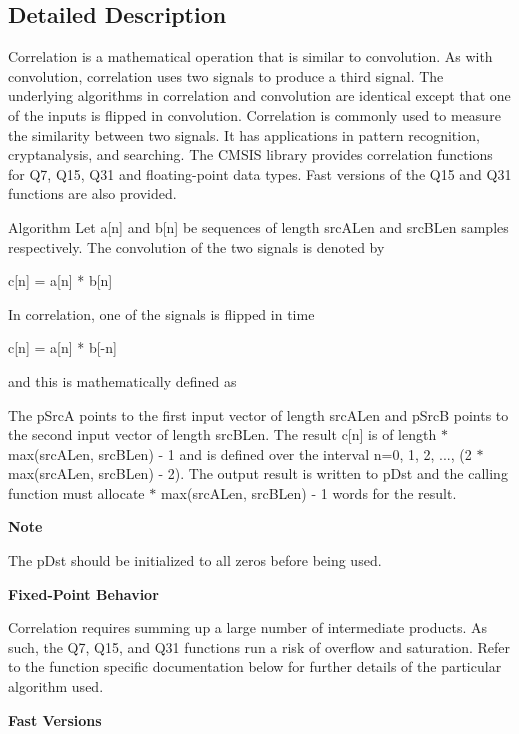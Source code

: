 \subsection{Detailed Description}
Correlation is a mathematical operation that is similar to convolution. As with convolution, correlation uses two signals to produce a third signal. The underlying algorithms in correlation and convolution are identical except that one of the inputs is flipped in convolution. Correlation is commonly used to measure the similarity between two signals. It has applications in pattern recognition, cryptanalysis, and searching. The C\+M\+S\+IS library provides correlation functions for Q7, Q15, Q31 and floating-\/point data types. Fast versions of the Q15 and Q31 functions are also provided.

\begin{DoxyParagraph}{Algorithm}
Let {\ttfamily a\mbox{[}n\mbox{]}} and {\ttfamily b\mbox{[}n\mbox{]}} be sequences of length {\ttfamily src\+A\+Len} and {\ttfamily src\+B\+Len} samples respectively. The convolution of the two signals is denoted by 
\begin{DoxyPre}
                  c[n] = a[n] * b[n]
\end{DoxyPre}
 In correlation, one of the signals is flipped in time 
\begin{DoxyPre}
                  c[n] = a[n] * b[-n]
\end{DoxyPre}

\end{DoxyParagraph}
\begin{DoxyParagraph}{}
and this is mathematically defined as  
\end{DoxyParagraph}
\begin{DoxyParagraph}{}
The {\ttfamily p\+SrcA} points to the first input vector of length {\ttfamily src\+A\+Len} and {\ttfamily p\+SrcB} points to the second input vector of length {\ttfamily src\+B\+Len}. The result {\ttfamily c\mbox{[}n\mbox{]}} is of length { $\ast$ max(src\+A\+Len, src\+B\+Len) -\/ 1} and is defined over the interval {\ttfamily n=0, 1, 2, ..., (2 $\ast$ max(src\+A\+Len, src\+B\+Len) -\/ 2)}. The output result is written to {\ttfamily p\+Dst} and the calling function must allocate { $\ast$ max(src\+A\+Len, src\+B\+Len) -\/ 1} words for the result.
\end{DoxyParagraph}
{\bfseries Note} \begin{DoxyParagraph}{}
The {\ttfamily p\+Dst} should be initialized to all zeros before being used.
\end{DoxyParagraph}
{\bfseries Fixed-\/\+Point Behavior} \begin{DoxyParagraph}{}
Correlation requires summing up a large number of intermediate products. As such, the Q7, Q15, and Q31 functions run a risk of overflow and saturation. Refer to the function specific documentation below for further details of the particular algorithm used.
\end{DoxyParagraph}
{\bfseries Fast Versions}

